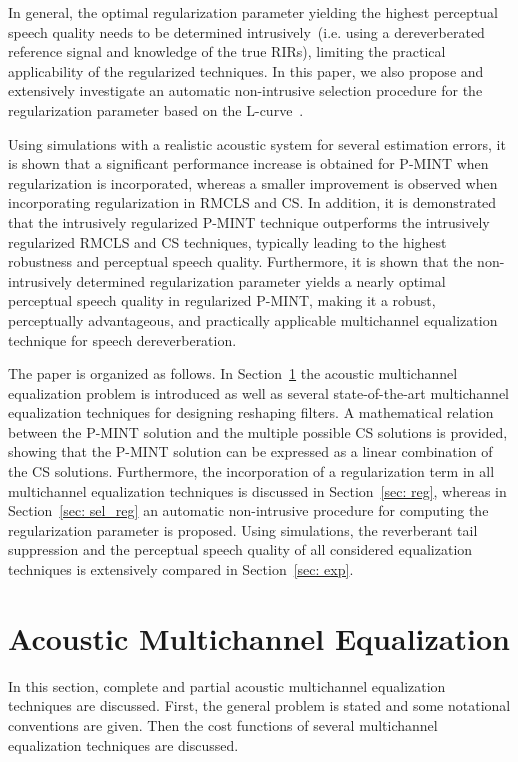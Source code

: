 \documentclass[10pt]{IEEEtran}
\begin{document}
In general, the optimal regularization parameter yielding the highest perceptual speech quality needs to be determined intrusively~(i.e. using a dereverberated reference signal and knowledge of the true RIRs), limiting the practical applicability of the regularized techniques.
In this paper, we also propose and extensively investigate an automatic non-intrusive selection procedure for the regularization parameter based on the L-curve~\cite{Hansen_1993}.

Using simulations with a realistic acoustic system for several estimation errors, it is shown that a significant performance increase is obtained for P-MINT when regularization is incorporated, whereas a smaller improvement is observed when incorporating regularization in RMCLS and CS.
In addition, it is demonstrated that the intrusively regularized P-MINT technique outperforms the intrusively regularized RMCLS and CS techniques, typically leading to the highest robustness and perceptual speech quality.
Furthermore, it is shown that the non-intrusively determined regularization parameter yields a nearly optimal perceptual speech quality in regularized P-MINT, making it a robust, perceptually advantageous, and practically applicable multichannel equalization technique for speech dereverberation.

The paper is organized as follows.
In Section~\ref{sec: intro} the acoustic multichannel equalization problem is introduced as well as several state-of-the-art multichannel equalization  techniques for designing reshaping filters.
A mathematical relation between the P-MINT solution and the multiple possible CS solutions is provided, showing that the P-MINT solution can be expressed as a linear combination of the CS solutions.
Furthermore, the incorporation of a regularization term in all multichannel equalization techniques is discussed in Section~\ref{sec: reg}, whereas in  Section~\ref{sec: sel_reg} an automatic non-intrusive procedure for computing the regularization parameter is proposed.
Using simulations, the reverberant tail suppression and the perceptual speech quality of all considered equalization techniques is extensively compared in Section~\ref{sec: exp}.

\section{Acoustic Multichannel Equalization}
\label{sec: intro}
In this section, complete and partial acoustic multichannel equalization techniques are discussed.
First, the general problem is stated and some notational conventions are given.
Then the cost functions of several multichannel equalization techniques are discussed.
\end{document}
